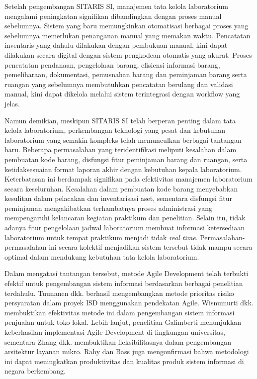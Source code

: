 Setelah pengembangan SITARIS SI, manajemen tata kelola laboratorium mengalami peningkatan signifikan dibandingkan dengan proses manual sebelumnya. Sistem yang baru memungkinkan otomatisasi berbagai proses yang sebelumnya memerlukan penanganan manual yang memakan waktu. Pencatatan inventaris yang dahulu dilakukan dengan pembukuan manual, kini dapat dilakukan secara digital dengan sistem pengkodean otomatis yang akurat. Proses pencatatan pendanaan, pengelolaan barang, efisiensi informasi barang, pemeliharaan, dokumentasi, pemusnahan barang dan peminjaman barang serta ruangan yang sebelumnya membutuhkan pencatatan berulang dan validasi manual, kini dapat dikelola melalui sistem terintegrasi dengan workflow yang jelas.

Namun demikian, meskipun SITARIS SI telah berperan penting dalam tata kelola laboratorium, perkembangan teknologi yang pesat dan kebutuhan laboratorium yang semakin kompleks telah memunculkan berbagai tantangan baru. Beberapa permasalahan yang teridentifikasi meliputi kesalahan dalam pembuatan kode barang, disfungsi fitur peminjaman barang dan ruangan, serta ketidaksesuaian format laporan akhir dengan kebutuhan kepala laboratorium. Keterbatasan ini berdampak signifikan pada efektivitas manajemen laboratorium secara keseluruhan. Kesalahan dalam pembuatan kode barang menyebabkan kesulitan dalam pelacakan dan inventarisasi aset, sementara disfungsi fitur peminjaman mengakibatkan terhambatnya proses administrasi yang mempengaruhi kelancaran kegiatan praktikum dan penelitian. Selain itu, tidak adanya fitur pengelolaan jadwal laboratorium membuat informasi ketersediaan laboratorium untuk tempat praktikum menjadi tidak \textit{real time}. Permasalahan-permasalahan ini secara kolektif menjadikan sistem tersebut tidak mampu secara optimal dalam mendukung kebutuhan tata kelola laboratorium.

Dalam mengatasi tantangan tersebut, metode Agile Development telah terbukti efektif untuk pengembangan sistem informasi berdasarkan berbagai penelitian terdahulu. Tuunanen dkk. \citeyear{tuunanen2023development} berhasil mengembangkan metode prioritas risiko persyaratan dalam proyek ISD menggunakan pendekatan Agile. Wisnumurti dkk. \citeyear{wisnumurti2022penerapan} membuktikan efektivitas metode ini dalam pengembangan sistem informasi penjualan untuk toko lokal. Lebih lanjut, penelitian Galimberti \citeyear{trelles2021agile} menunjukkan keberhasilan implementasi Agile Development di lingkungan universitas, sementara Zhang dkk.\citeyear{zhang2024establishment}  membuktikan fleksibilitasnya dalam pengembangan arsitektur layanan mikro. Rahy dan Bass \citeyear{rahy2020implementation} juga mengonfirmasi bahwa metodologi ini dapat meningkatkan produktivitas dan kualitas produk sistem informasi di negara berkembang.

